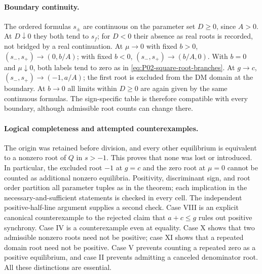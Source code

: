 \paragraph{Boundary continuity.}
The ordered formulas $s_\pm$ are continuous on the parameter set
$D\ge0$, since $A>0$. At $D\downarrow0$ they both tend to $s_f$;
for $D<0$ their absence as real roots is recorded, not bridged by
a real continuation. At $\mu\to0$ with fixed $b>0$,
$(s_-,s_+)\to(0,b/A)$; with fixed $b<0$,
$(s_-,s_+)\to(b/A,0)$. With $b=0$ and $\mu\downarrow0$, both labels
tend to zero as in \eqref{eq:P02-square-root-branches}. At $g\to c$,
$(s_-,s_+)\to(-1,a/A)$; the first root is excluded from the DM domain
at the boundary.
At $b\to0$ all limits within $D\ge0$ are again given by the same
continuous formulas. The sign-specific table is therefore compatible
with every boundary, although admissible root counts can change there.

\clearpage
\paragraph{Logical completeness and attempted counterexamples.}
The origin was retained before division, and every other equilibrium
is equivalent to a nonzero root of $Q$ in $s>-1$. This proves that
none was lost or introduced. In particular, the excluded root $-1$
at $g=c$ and the zero root at $\mu=0$ cannot be counted as additional
nonzero equilibria. Positivity, discriminant sign, and root order
partition all parameter tuples as in the theorem; each implication
in the necessary-and-sufficient statements is checked in every cell.
The independent positive-half-line argument supplies a second check.
Case VIII is an explicit canonical counterexample to the rejected
claim that $a+c\le g$ rules out positive synchrony. Case IV is a
counterexample even at equality. Case X shows that two admissible
nonzero roots need not be positive; case XI shows that a repeated
domain root need not be positive. Case V prevents counting a repeated
zero as a positive equilibrium, and case II prevents admitting a
canceled denominator root. All these distinctions are essential.

